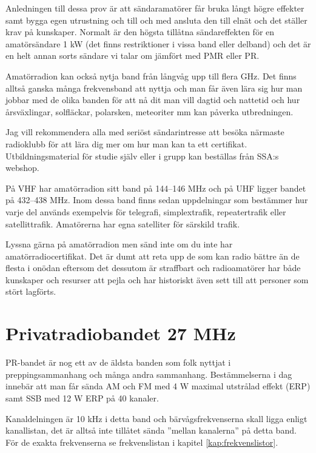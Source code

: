 Anledningen till dessa prov är att sändaramatörer får bruka långt högre effekter samt bygga egen utrustning och till och med ansluta den till elnät och det ställer krav på kunskaper. Normalt är den högsta tillåtna sändareffekten för en amatörsändare 1 kW (det finns restriktioner i vissa band eller delband) och det är en helt annan sorts sändare vi talar om jämfört med PMR eller PR.

Amatörradion kan också nytja band från långvåg upp till flera GHz. Det finns alltså ganska många frekvensband att nyttja och man får även lära sig hur man jobbar med de olika banden för att nå dit man vill dagtid och nattetid och hur årsväxlingar, solfläckar, polarsken, meteoriter mm kan påverka utbredningen.

Jag vill rekommendera alla med seriöst sändarintresse att besöka närmaste radioklubb för att lära dig mer om hur man kan ta ett certifikat. Utbildningsmaterial för studie själv eller i grupp kan beställas från SSA:s webshop.


På VHF har amatörradion sitt band på 144--146 MHz och på UHF ligger bandet på 432--438 MHz. Inom dessa band finns sedan uppdelningar som bestämmer hur varje del används exempelvis för telegrafi, simplextrafik, repeatertrafik eller satellittrafik. Amatörerna har egna satelliter för särskild trafik.

Lyssna gärna på amatörradion men sänd inte om du inte har amatörradiocertifikat. Det är dumt att reta upp de som kan radio bättre än de flesta i onödan eftersom det dessutom är straffbart och radioamatörer har både kunskaper och resurser att pejla och har historiskt även sett till att personer som stört lagförts.

\section{Privatradiobandet 27 MHz}

PR-bandet är nog ett av de äldsta banden som folk nyttjat i preppingsammanhang och många andra sammanhang. Bestämmelserna i dag innebär att man får sända AM och FM med 4 W maximal utstrålad effekt (ERP) samt SSB med 12 W ERP på 40 kanaler.

Kanaldelningen är 10 kHz i detta band och bärvågsfrekvenserna skall ligga enligt kanallistan, det är alltså inte tillåtet sända ''mellan kanalerna'' på detta band. För de exakta frekvenserna se frekvenslistan i kapitel \ref{kap:frekvenslistor}. 

